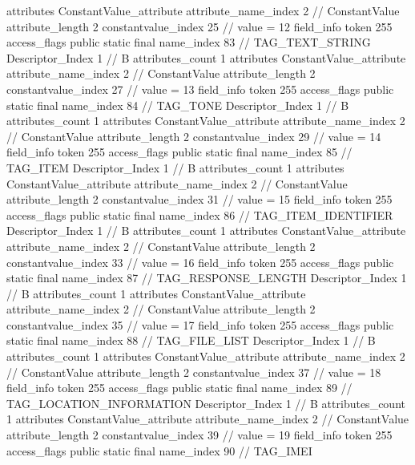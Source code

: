 {{{{{				attributes {
				ConstantValue_attribute {
					attribute_name_index	2		// ConstantValue
					attribute_length	2
					constantvalue_index	25		// value = 12
				}
				}
			}
			field_info {
				token	255
				access_flags	public static final
				name_index	83		// TAG_TEXT_STRING
				Descriptor_Index	1		// B
				attributes_count	1
				attributes {
				ConstantValue_attribute {
					attribute_name_index	2		// ConstantValue
					attribute_length	2
					constantvalue_index	27		// value = 13
				}
				}
			}
			field_info {
				token	255
				access_flags	public static final
				name_index	84		// TAG_TONE
				Descriptor_Index	1		// B
				attributes_count	1
				attributes {
				ConstantValue_attribute {
					attribute_name_index	2		// ConstantValue
					attribute_length	2
					constantvalue_index	29		// value = 14
				}
				}
			}
			field_info {
				token	255
				access_flags	public static final
				name_index	85		// TAG_ITEM
				Descriptor_Index	1		// B
				attributes_count	1
				attributes {
				ConstantValue_attribute {
					attribute_name_index	2		// ConstantValue
					attribute_length	2
					constantvalue_index	31		// value = 15
				}
				}
			}
			field_info {
				token	255
				access_flags	public static final
				name_index	86		// TAG_ITEM_IDENTIFIER
				Descriptor_Index	1		// B
				attributes_count	1
				attributes {
				ConstantValue_attribute {
					attribute_name_index	2		// ConstantValue
					attribute_length	2
					constantvalue_index	33		// value = 16
				}
				}
			}
			field_info {
				token	255
				access_flags	public static final
				name_index	87		// TAG_RESPONSE_LENGTH
				Descriptor_Index	1		// B
				attributes_count	1
				attributes {
				ConstantValue_attribute {
					attribute_name_index	2		// ConstantValue
					attribute_length	2
					constantvalue_index	35		// value = 17
				}
				}
			}
			field_info {
				token	255
				access_flags	public static final
				name_index	88		// TAG_FILE_LIST
				Descriptor_Index	1		// B
				attributes_count	1
				attributes {
				ConstantValue_attribute {
					attribute_name_index	2		// ConstantValue
					attribute_length	2
					constantvalue_index	37		// value = 18
				}
				}
			}
			field_info {
				token	255
				access_flags	public static final
				name_index	89		// TAG_LOCATION_INFORMATION
				Descriptor_Index	1		// B
				attributes_count	1
				attributes {
				ConstantValue_attribute {
					attribute_name_index	2		// ConstantValue
					attribute_length	2
					constantvalue_index	39		// value = 19
				}
				}
			}
			field_info {
				token	255
				access_flags	public static final
				name_index	90		// TAG_IMEI
}}}}}
